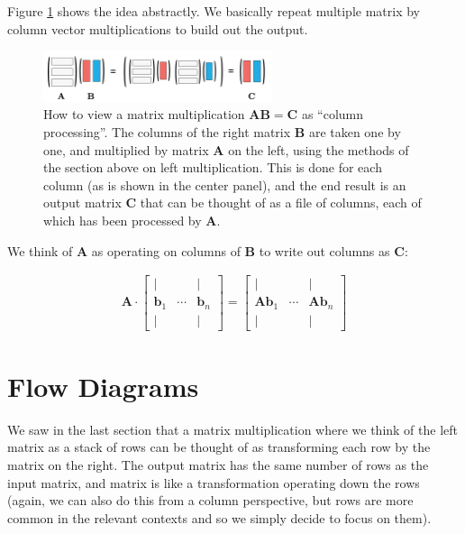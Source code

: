 Figure \ref{columnPerspective} shows the idea abstractly. We basically repeat multiple matrix by column vector multiplications to build out the output. 

\begin{figure}[h]
\centering
\includegraphics[width=0.6\textwidth]{images/columnPerspective.png}
\caption[Jeff Yoshimi.]{How to view a matrix multiplication  $\mathbf{A}\mathbf{B} = \mathbf{C}$ as ``column processing''.  The columns of the right matrix $\mathbf{B}$ are taken one by one, and multiplied by matrix $\mathbf{A}$  on the left, using the methods of the section above on left multiplication.  This is done for each column (as is shown in the center panel), and the end result is an output matrix $\mathbf{C}$ that can be thought of as a file of columns, each of which has been processed by $\mathbf{A}$.}
\label{columnPerspective}
\end{figure} 

We think of $\mathbf{A}$ as operating on columns of $\mathbf{B}$ to write out columns as $\mathbf{C}$:

\begin{align*}
\mathbf{A} \cdot
\begin{bmatrix}
\vert &        & \vert \\
\mathbf{b}_1 & \cdots & \mathbf{b}_n \\
\vert &        & \vert
\end{bmatrix}
=
\begin{bmatrix}
\vert &        & \vert \\
\mathbf{A} \mathbf{b}_1 & \cdots & \mathbf{A} \mathbf{b}_n \\
\vert &        & \vert
\end{bmatrix}
\end{align*}


\section{Flow Diagrams}\label{flowDiagrams}

We saw in the last section that a matrix multiplication where we think of the left matrix as a stack of rows can be thought of as transforming each row by the matrix on the right.  The output matrix has the same number of rows as the input matrix, and matrix is like a transformation operating down the rows (again, we can also do this from a column perspective, but rows are more common in the relevant contexts and so we simply decide to focus on them). 


